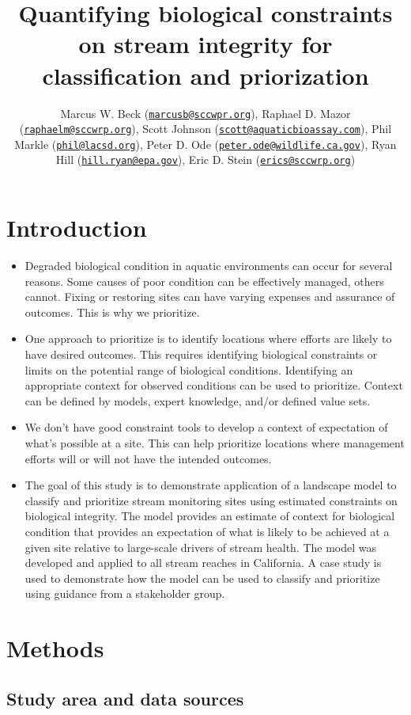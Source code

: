 \documentclass[]{article}
\title{Quantifying biological constraints on stream integrity for
classification and priorization}
\author{Marcus W. Beck
(\href{mailto:marcusb@sccwpr.org}{\nolinkurl{marcusb@sccwpr.org}}),
Raphael D. Mazor
(\href{mailto:raphaelm@sccwrp.org}{\nolinkurl{raphaelm@sccwrp.org}}),
Scott Johnson
(\href{mailto:scott@aquaticbioassay.com}{\nolinkurl{scott@aquaticbioassay.com}}),
Phil Markle (\href{mailto:phil@lacsd.org}{\nolinkurl{phil@lacsd.org}}),
Peter D. Ode
(\href{mailto:peter.ode@wildlife.ca.gov}{\nolinkurl{peter.ode@wildlife.ca.gov}}),
Ryan Hill
(\href{mailto:hill.ryan@epa.gov}{\nolinkurl{hill.ryan@epa.gov}}), Eric
D. Stein (\href{mailto:erics@sccwrp.org}{\nolinkurl{erics@sccwrp.org}})}
\date{}
\begin{document}
\maketitle

\section{Introduction}\label{introduction}

\begin{itemize}
\item
  Degraded biological condition in aquatic environments can occur for
  several reasons. Some causes of poor condition can be effectively
  managed, others cannot. Fixing or restoring sites can have varying
  expenses and assurance of outcomes. This is why we prioritize.
\item
  One approach to prioritize is to identify locations where efforts are
  likely to have desired outcomes. This requires identifying biological
  constraints or limits on the potential range of biological conditions.
  Identifying an appropriate context for observed conditions can be used
  to prioritize. Context can be defined by models, expert knowledge,
  and/or defined value sets.
\item
  We don't have good constraint tools to develop a context of
  expectation of what's possible at a site. This can help prioritize
  locations where management efforts will or will not have the intended
  outcomes.
\item
  The goal of this study is to demonstrate application of a landscape
  model to classify and prioritize stream monitoring sites using
  estimated constraints on biological integrity. The model provides an
  estimate of context for biological condition that provides an
  expectation of what is likely to be achieved at a given site relative
  to large-scale drivers of stream health. The model was developed and
  applied to all stream reaches in California. A case study is used to
  demonstrate how the model can be used to classify and prioritize using
  guidance from a stakeholder group.
\end{itemize}

\section{Methods}\label{methods}

\subsection{Study area and data
sources}\label{study-area-and-data-sources}
\end{document}
